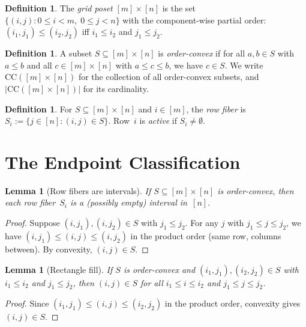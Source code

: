 \documentclass[11pt,a4paper]{article}
\theoremstyle{plain}
\newtheorem{lemma}[theorem]{Lemma}
\theoremstyle{definition}
\newtheorem{definition}[theorem]{Definition}
\theoremstyle{remark}
\newcommand{\CC}{\mathrm{CC}}
\begin{document}
\begin{definition}
The \emph{grid poset} $[m] \times [n]$ is the set $\{(i,j) : 0 \leq i < m,\; 0 \leq j < n\}$ with the component-wise partial order: $(i_1, j_1) \leq (i_2, j_2)$ iff $i_1 \leq i_2$ and $j_1 \leq j_2$.
\end{definition}

\begin{definition}
A subset $S \subseteq [m] \times [n]$ is \emph{order-convex} if for all $a, b \in S$ with $a \leq b$ and all $c \in [m] \times [n]$ with $a \leq c \leq b$, we have $c \in S$.
We write $\CC([m] \times [n])$ for the collection of all order-convex subsets, and $|\CC([m] \times [n])|$ for its cardinality.
\end{definition}

\begin{definition}
For $S \subseteq [m] \times [n]$ and $i \in [m]$, the \emph{row fiber} is $S_i := \{j \in [n] : (i,j) \in S\}$.
Row~$i$ is \emph{active} if $S_i \neq \emptyset$.
\end{definition}


\section{The Endpoint Classification}\label{sec:classification}

\begin{lemma}[Row fibers are intervals]\label{lem:fiber}
If $S \subseteq [m] \times [n]$ is order-convex, then each row fiber~$S_i$ is a (possibly empty) interval in~$[n]$.
\end{lemma}

\begin{proof}
Suppose $(i, j_1), (i, j_2) \in S$ with $j_1 \leq j_2$.
For any $j$ with $j_1 \leq j \leq j_2$, we have $(i, j_1) \leq (i, j) \leq (i, j_2)$ in the product order (same row, columns between).
By convexity, $(i, j) \in S$.
\end{proof}

\begin{lemma}[Rectangle fill]\label{lem:rectangle}
If $S$ is order-convex and $(i_1, j_1), (i_2, j_2) \in S$ with $i_1 \leq i_2$ and $j_1 \leq j_2$, then $(i, j) \in S$ for all $i_1 \leq i \leq i_2$ and $j_1 \leq j \leq j_2$.
\end{lemma}

\begin{proof}
Since $(i_1, j_1) \leq (i, j) \leq (i_2, j_2)$ in the product order, convexity gives $(i, j) \in S$.
\end{proof}
\end{document}
